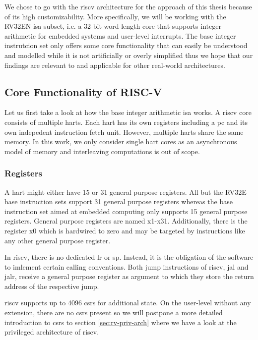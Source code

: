 We chose to go with the \gls{riscv} architecture for the approach of this thesis because of its high customizability.
More specifically, we will be working with the RV32EN \gls{isa} subset, i.e. a 32-bit word-length core that supports integer arithmetic for embedded systems and user-level interrupts.
The base integer instrutcion set only offers some core functionality that can easily be understood and modelled while it is not artificially or overly simplified thus we hope that our findings are relevant to and applicable for other real-world architectures.

\subsection{Core Functionality of RISC-V}

Let us first take a look at how the base integer arithmetic \gls{isa} works.
A \gls{riscv} core consists of multiple \glspl{hart}.
Each \gls{hart} has its own registers including a \gls{pc} and its own indepedent instruction fetch unit.
However, multiple \glspl{hart} share the same memory.
In this work, we only consider single \gls{hart} cores as an asynchronous model of memory and interleaving computations is out of scope.

\subsubsection{Registers}
A \gls{hart} might either have 15 or 31 general purpose registers.
All but the RV32E base instruction sets support 31 general purpose registers whereas the base instruction set aimed at embedded computing only supports 15 general purpose registers.
General purpose registers are named x1-x31.
Additionally, there is the register x0 which is hardwired to zero and may be targeted by instructions like any other general purpose register.

In \gls{riscv}, there is no dedicated \gls{lr} or \gls{sp}.
Instead, it is the obligation of the software to imlement certain calling conventions.
Both jump instructions of \gls{riscv}, \gls{jal} and \gls{jalr}, receive a general purpose register as argument to which they store the return address of the respective jump.

\gls{riscv} supports up to 4096 \glspl{csr} for additional state.
On the user-level without any extension, there are no \glspl{csr} present so we will postpone a more detailed introduction to \glspl{csr} to section \ref{sec:rv-priv-arch} where we have a look at the privileged architecture of \gls{riscv}.

